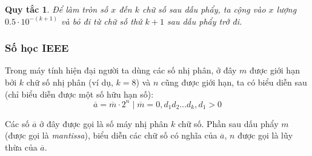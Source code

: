 \documentclass{book}
\newtheorem*{rule_of_thumb}{Quy tắc}
\begin{document}
\begin{rule_of_thumb}
    Để làm tròn số \(x\) đến \(k\) chữ số sau dấu phẩy, ta cộng vào \(x\) lượng
    \(\num{0.5} \cdot 10^{-(k+1)}\) và bỏ đi từ chữ số thứ \(k+1\) sau dấu phẩy
    trở đi.
\end{rule_of_thumb}

\subsubsection{Số học IEEE}

Trong máy tính hiện đại người ta dùng các số nhị phân, ở đây \(m\) được giới
hạn bởi \(k\) chữ số nhị phân (ví dụ, \(k = 8\)) và \(n\) cũng được giới hạn, ta
có biểu diễn sau (chỉ biểu diễn được một số hữu hạn số):
\begin{equation}
    \overline{a} = \overline{m} \cdot 2^n \mid \overline{m} = 0,d_1d_2\ldots d_k, d_1 > 0
\end{equation}

Các số \(\overline{a}\) ở đây được gọi là số máy nhị phân \(k\) chữ số. Phần sau
dấu phẩy \(m\) (được gọi là \emph{mantissa}), biểu diễn các chữ số có nghĩa của
\(\overline{a}\), \(n\) được gọi là lũy thừa của \(\overline{a}\).
\end{document}
